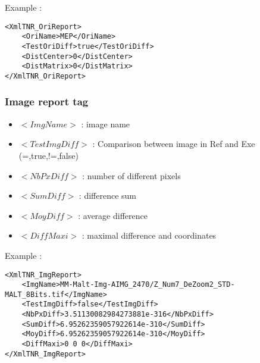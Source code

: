 \documentclass[a4paper]{book}
\begin{document}
Example : 
\begin{lstlisting}
<XmlTNR_OriReport>
	<OriName>MEP</OriName>
	<TestOriDiff>true</TestOriDiff>
	<DistCenter>0</DistCenter>
	<DistMatrix>0</DistMatrix>
</XmlTNR_OriReport>
\end{lstlisting}

\subsubsection{Image report tag}
\begin{itemize}
\item $<ImgName>$ : image name
\item $<TestImgDiff>$ : Comparison between image in Ref and Exe (=,true,!=,false)
\item $<NbPxDiff>$ : number of different pixels
\item $<SumDiff>$ : difference sum
\item $<MoyDiff>$ : average difference
\item $<DiffMaxi>$ : maximal difference and coordinates
\end{itemize}

Example : 
\begin{lstlisting}
<XmlTNR_ImgReport>
	<ImgName>MM-Malt-Img-AIMG_2470/Z_Num7_DeZoom2_STD-MALT_8Bits.tif</ImgName>
	<TestImgDiff>false</TestImgDiff>
	<NbPxDiff>3.51130082984273881e-316</NbPxDiff>
	<SumDiff>6.95262359057922614e-310</SumDiff>
	<MoyDiff>6.95262359057922614e-310</MoyDiff>
	<DiffMaxi>0 0 0</DiffMaxi>
</XmlTNR_ImgReport>
\end{lstlisting}
\end{document}
